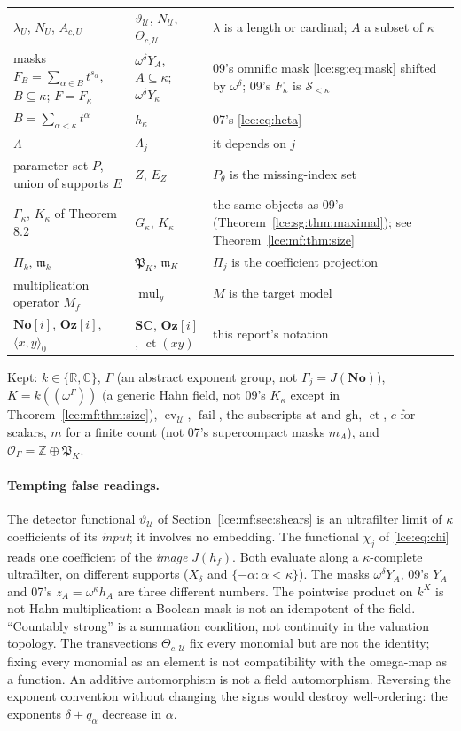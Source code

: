 \documentclass[11pt,letterpaper]{article}
\numberwithin{equation}{section}
\theoremstyle{definition}
\theoremstyle{remark}
\newcommand{\No}{\mathbf{No}}
\newcommand{\Oz}{\mathbf{Oz}}
\newcommand{\SC}{\mathbf{SC}}
\newcommand{\R}{\mathbb R}
\newcommand{\C}{\mathbb C}
\newcommand{\Z}{\mathbb Z}
\newcommand{\ct}{\operatorname{ct}}
\newcommand{\Sk}{\mathscr S_{<\kappa}}
\newcommand{\Gam}{\Gamma_j}
\newcommand{\infideal}{\mathfrak m}
\newcommand{\thref}[1]{Theorem~\ref{#1}}
\newcommand{\HF}[2]{#1((\omega^{#2}))}
\newcommand{\ev}{\operatorname{ev}}
\newcommand{\at}{\mathrm{at}}
\newcommand{\gh}{\mathrm{gh}}
\newcommand{\fail}{\operatorname{fail}}
\begin{document}
\begin{center}
\begin{longtable}{@{}P{0.26\textwidth}P{0.2\textwidth}P{0.46\textwidth}@{}}
$\lambda_U$, $N_U$, $A_{c,U}$ & $\vartheta_{\mathcal U}$,
$N_{\mathcal U}$, $\Theta_{c,\mathcal U}$ & $\lambda$ is a length or
cardinal; $A$ a subset of $\kappa$\\
masks $F_B=\sum_{\alpha\in B}t^{s_\alpha}$, $B\subseteq\kappa$; $F=F_\kappa$
& $\omega^\delta Y_A$, $A\subseteq\kappa$; $\omega^\delta Y_\kappa$ & 09's
omnific mask \eqref{lce:sg:eq:mask} shifted by $\omega^\delta$; 09's
$F_\kappa$ is $\Sk$\\
$B=\sum_{\alpha<\kappa}t^\alpha$ & $h_\kappa$ & 07's \eqref{lce:eq:heta}\\
$\Lambda$ & $\Lambda_j$ & it depends on $j$\\
parameter set $P$, union of supports $E$ & $Z$, $E_Z$ & $P_\theta$ is the
missing-index set\\
$\Gamma_\kappa$, $K_\kappa$ of Theorem 8.2 & $G_\kappa$, $K_\kappa$ & the
same objects as 09's (\thref{lce:sg:thm:maximal}); see
\thref{lce:mf:thm:size}\\
$\Pi_k$, $\mathfrak m_k$ & $\mathfrak P_K$, $\infideal_K$ & $\Pi_j$ is the
coefficient projection\\
multiplication operator $M_f$ & $\operatorname{mul}_y$ & $M$ is the target
model\\
$\No[i]$, $\Oz[i]$, $\langle x,y\rangle_0$ & $\SC$, $\Oz[i]$,
$\ct(xy)$ & this report's notation\\
\bottomrule
\end{longtable}
\end{center}
Kept: $k\in\{\R,\C\}$, $\Gamma$ (an abstract exponent group, not
$\Gam=J(\No)$), $K=\HF k\Gamma$ (a generic Hahn field, not 09's $K_\kappa$
except in \thref{lce:mf:thm:size}), $\ev_{\mathcal U}$, $\fail$, the
subscripts $\at$ and $\gh$, $\ct$, $c$ for scalars, $m$ for a finite count
(not 07's supercompact masks $m_A$), and $\mathcal O_\Gamma=\Z\oplus\mathfrak
P_K$.

\paragraph{Tempting false readings.} The detector functional
$\vartheta_{\mathcal U}$ of Section~\ref{lce:mf:sec:shears} is an
ultrafilter limit of $\kappa$ coefficients of its \emph{input}; it involves
no embedding. The functional $\chi_j$ of \eqref{lce:eq:chi} reads one
coefficient of the \emph{image} $J(h_f)$. Both evaluate along a
$\kappa$-complete ultrafilter, on different supports ($X_\delta$ and
$\{-\alpha:\alpha<\kappa\}$). The masks $\omega^\delta Y_A$, 09's $Y_A$ and
07's $z_A=\omega^\kappa h_A$ are three different numbers. The pointwise
product on $k^X$ is not Hahn multiplication: a Boolean mask is not an
idempotent of the field. ``Countably strong'' is a summation condition, not
continuity in the valuation topology. The transvections $\Theta_{c,\mathcal
U}$ fix every monomial but are not the identity; fixing every monomial as an
element is not compatibility with the omega-map as a function. An additive
automorphism is not a field automorphism. Reversing the exponent
convention without changing the signs would destroy well-ordering: the
exponents $\delta+q_\alpha$ decrease in $\alpha$.
\end{document}
